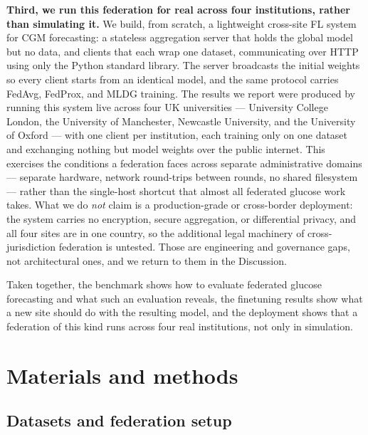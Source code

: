 \documentclass[10pt,letterpaper]{article}
\begin{document}
\textbf{Third, we run this federation for real across four institutions, rather
than simulating it.} We build, from scratch, a lightweight
cross-site FL system for CGM forecasting: a stateless aggregation server that
holds the global model but no data, and clients that each wrap one dataset,
communicating over HTTP using only the Python standard library. The server
broadcasts the initial weights so every client starts from an identical model, and
the same protocol carries FedAvg, FedProx, and MLDG training. The results we
report were produced by running this system live across four UK universities ---
University College London, the University of Manchester, Newcastle University, and
the University of Oxford --- with one client per institution, each training only
on one dataset and exchanging nothing but model weights over the public
internet. This exercises the conditions a federation faces across separate
administrative domains --- separate hardware, network round-trips between
rounds, no shared filesystem --- rather than the single-host shortcut that
almost all federated glucose work takes. What we do
\emph{not} claim is a production-grade or cross-border deployment: the system
carries no encryption, secure aggregation, or differential privacy, and all four
sites are in one country, so the additional legal machinery of cross-jurisdiction
federation is untested. Those are engineering and governance gaps, not
architectural ones, and we return to them in the Discussion.

Taken together, the benchmark shows how to evaluate federated glucose forecasting
and what such an evaluation reveals, the finetuning results show what a
new site should do with the resulting model, and the deployment shows that a
federation of this kind runs across four real institutions, not only in
simulation.

\section*{Materials and methods}

\subsection*{Datasets and federation setup}
\end{document}
